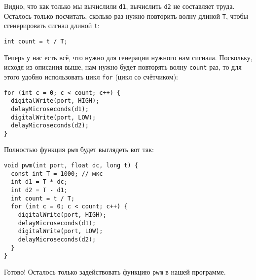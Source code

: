 \documentclass[../sparc.tex]{subfiles}
\begin{document}
Видно, что как только мы вычислили \texttt{d1}, вычислить \texttt{d2} не
составляет труда. Осталось только посчитать, сколько раз нужно повторить волну
длиной \texttt{T}, чтобы сгенерировать сигнал длиной \texttt{t}:

\begin{verbatim}
int count = t / T;
\end{verbatim}

Теперь у нас есть всё, что нужно для генерации нужного нам сигнала. Поскольку,
исходя из описания выше, нам нужно будет повторять волну \texttt{count} раз, то
для этого удобно использовать цикл \texttt{for} (цикл со счётчиком):

\begin{verbatim}
for (int c = 0; c < count; c++) {
  digitalWrite(port, HIGH);
  delayMicroseconds(d1);
  digitalWrite(port, LOW);
  delayMicroseconds(d2);
}
\end{verbatim}

Полностью функция \texttt{pwm} будет выглядеть вот так:

\begin{verbatim}
void pwm(int port, float dc, long t) {
  const int T = 1000; // мкс
  int d1 = T * dc;
  int d2 = T - d1;
  int count = t / T;
  for (int c = 0; c < count; c++) {
    digitalWrite(port, HIGH);
    delayMicroseconds(d1);
    digitalWrite(port, LOW);
    delayMicroseconds(d2);
  }
}
\end{verbatim}

Готово! Осталось только задействовать функцию \texttt{pwm} в нашей программе.
\end{document}

